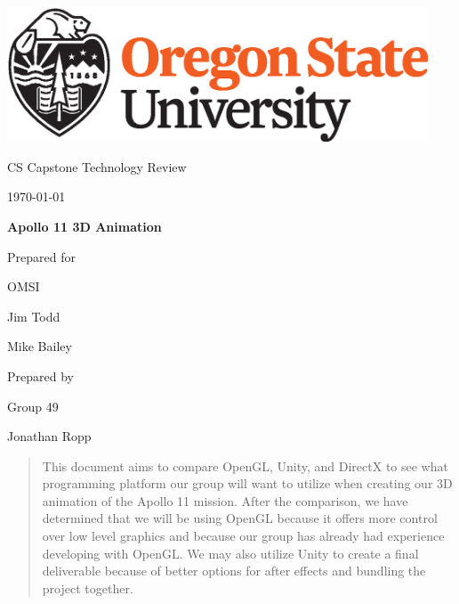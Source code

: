 \documentclass[onecolumn, draftclsnofoot,10pt, compsoc]{IEEEtran}
\def \CapstoneTeamName{		    The Apolloers}
\def \CapstoneTeamNumber{		49}
\def \GroupMemberOne{			Jonathan Ropp}
\def \GroupMemberTwo{			Shannon Sandy}
\def \GroupMemberThree{			Dean Akin}
\def \CapstoneProjectName{		Apollo 11 3D Animation}
\def \CapstoneSponsorCompany{	OMSI}
\def \CapstoneSponsorPersona{	Jim Todd}
\def \CapstoneSponsorPersonb{	Mike Bailey}
\newcommand{\NameSigPair}[1]{\par
\makebox[2.75in][r]{#1} \hfil 	\makebox[3.25in]{\makebox[2.25in]{\hrulefill} \hfill		\makebox[.75in]{\hrulefill}}
\par\vspace{-12pt} \textit{\tiny\noindent
\makebox[2.75in]{} \hfil		\makebox[3.25in]{\makebox[2.25in][r]{Signature} \hfill	\makebox[.75in][r]{Date}}}}
\renewcommand{\NameSigPair}[1]{#1}
\begin{document}
\begin{titlepage}
    \begin{singlespace}
        \hfill 
        \includegraphics[height=4cm]{OSU_horizontal_2C_O_over_B.eps}   
        \par\vspace{.2in}
        \centering
        \scshape{
            \huge CS Capstone Technology Review \par
            {\large\today}\par
            \vspace{.5in}
            \textbf{\Huge\CapstoneProjectName}\par
            \vfill
            {\large Prepared for}\par
            \Huge \CapstoneSponsorCompany\par
            \vspace{5pt}
            {\Large\NameSigPair{\CapstoneSponsorPersona}\par}
            {\Large\NameSigPair{\CapstoneSponsorPersonb}\par}
            {\large Prepared by }\par
            Group\CapstoneTeamNumber\par
            \vspace{5pt}
            {\Large
                \NameSigPair{\GroupMemberOne}\par
            }
            \vspace{20pt}
        }
        \begin{abstract}
        	This document aims to compare OpenGL, Unity, and DirectX to see what programming platform our group will want to utilize when creating our 3D animation of the Apollo 11 mission. After the comparison, we have determined that we will be using OpenGL because it offers more control over low level graphics and because our group has already had experience developing with OpenGL. We may also utilize Unity to create a final deliverable because of better options for after effects and bundling the project together. 
        \end{abstract}     
    \end{singlespace}
\end{titlepage}
\end{document}
